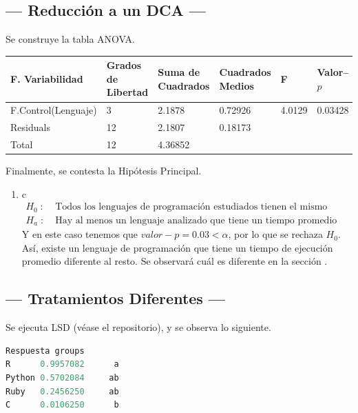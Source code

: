 \documentclass[11pt,a4paper]{article}
\begin{document}
\subsection{--- Reducción a un DCA ---} %
\label{sub:dca}
Se construye la tabla ANOVA.
\begin{table}[hbt!]
	\centering
	\footnotesize
	\begin{tabular}{|*{6}{l|}}
		\hline
		F. Variabilidad     & Grados de Libertad & Suma de Cuadrados & Cuadrados Medios & F & Valor--\(p\) \\ \hline
		F.Control(Lenguaje) &  3 & 2.1878 & 0.72926  & 4.0129 & 0.03428\\ \hline
		Residuals           & 12 & 2.1807 & 0.18173  &        &        \\ \hline
		Total               &12 & 4.36852 &          &        & \\ \hline
	\end{tabular}
	\label{tab:nuevo_modelo}
\end{table}
Finalmente, se contesta la Hipótesis Principal.
\begin{enumerate}
	\item[\fbox{Hip. Principal}] \color{white} c \color{black}
		\[
			\begin{array}{rl}
				H_0 \;:\; & \mbox{Todos los lenguajes de programación estudiados tienen el mismo tiempo de ejecución promedio.} \\
				H_a \;:\; & \mbox{Hay al menos un lenguaje analizado que tiene un tiempo promedio de ejecución diferente.}
			\end{array}
		\]
		Y en este caso tenemos que \(valor-p = 0.03 < \alpha\), por lo que se rechaza \(H_0\).
		Así, existe un lenguaje de programación que tiene un tiempo de ejecución promedio diferente al resto.
		Se observará cuál es diferente en la sección .
\end{enumerate}

\subsection{--- Tratamientos Diferentes ---} %
\label{sub:trata_diferentes}
Se ejecuta LSD (véase el repositorio), y se observa lo siguiente.
% 
% 
% 
% 
\begin{lstlisting}[language = R]
       Respuesta groups
R      0.9957082      a
Python 0.5702084     ab
Ruby   0.2456250     ab
C      0.0106250      b
\end{lstlisting}
\end{document}

